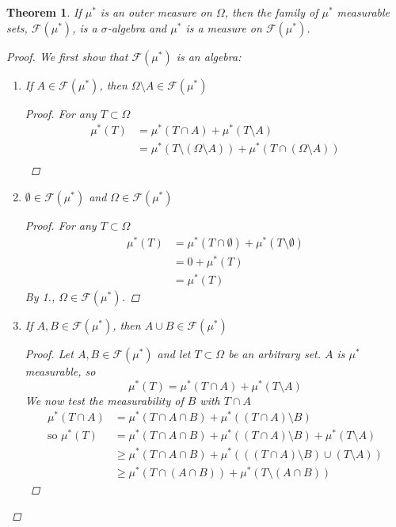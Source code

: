 \documentclass[12pt]{article}
\newtheorem{theorem}{Theorem}
\begin{document}
\begin{theorem} \label{T:Caratheodory}
	If $\mu^*$ is an outer measure on $\Omega$, then the family of $\mu^*$ measurable sets, $\mathcal{F}(\mu^*)$, is a $\sigma$-algebra and $\mu^*$ is a measure on $\mathcal{F}(\mu^*)$.
	\begin{proof}
		We first show that $\mathcal{F}(\mu^*)$ is an algebra:
		\begin{enumerate}
			\item If $A \in \mathcal{F}(\mu^*)$, then $\Omega \setminus A \in \mathcal{F}(\mu^*)$
			\begin{proof}
					For any $T \subset \Omega$
					\begin{align*}
						\mu^*(T) &= \mu^*(T \cap A) + \mu^*(T \setminus A)\\
						&= \mu^*(T \setminus (\Omega \setminus A)) + \mu^*(T \cap (\Omega \setminus A))\\
					\end{align*}
			\end{proof}
			\item $\emptyset \in \mathcal{F}(\mu^*)$ and $\Omega \in \mathcal{F}(\mu^*)$
			\begin{proof}
					For any $T \subset \Omega$
					\begin{align*}
						\mu^*(T) &= \mu^*(T \cap \emptyset) + \mu^*(T \setminus \emptyset)\\
						&= 0 + \mu^*(T)\\
						&= \mu^*(T)
					\end{align*}
					By 1., $\Omega \in \mathcal{F}(\mu^*)$.
			\end{proof}
			\item If $A, B \in \mathcal{F}(\mu^*)$, then $A \cup B \in \mathcal{F}(\mu^*)$
			\begin{proof}
					Let $A, B \in \mathcal{F}(\mu^*)$ and let $T \subset \Omega$ be an arbitrary set. $A$ is $\mu^*$ measurable, so
					$$\mu^*(T) = \mu^*(T \cap A) + \mu^*(T \setminus A)$$
					We now test the measurability of $B$ with $T \cap A$
					\begin{align*}
						\mu^*(T \cap A) &= \mu^*(T \cap A \cap B) + \mu^*((T \cap A) \setminus B)\\
						\text{so } \mu^*(T) &= \mu^*(T \cap A \cap B) + \mu^*((T \cap A) \setminus B) + \mu^*(T \setminus A)\\
						&\ge \mu^*(T \cap A \cap B) + \mu^*(((T \cap A) \setminus B) \cup (T \setminus A))\\
						&\ge \mu^*(T \cap (A \cap B)) + \mu^*(T \setminus (A \cap B))

\end{align*}
\end{proof}
\end{enumerate}
\end{proof}
\end{theorem}
\end{document}
